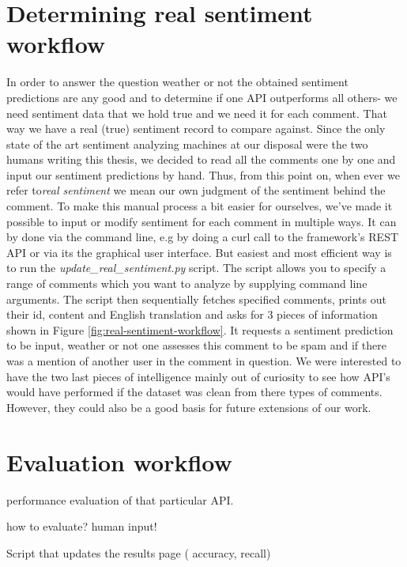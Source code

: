 \section{Determining real sentiment workflow\label{sec:determining-real-sentiment-workflow}}
In order to answer the question weather or not the obtained sentiment predictions are any good and to determine if one API outperforms all others- we need sentiment data that we hold true and we need it for each comment. That way we have a real (true) sentiment record to compare against.
Since the only state of the art sentiment analyzing machines at our disposal were the two humans writing this thesis, we decided to read all the comments one by one and input our sentiment predictions by hand. 
Thus, from this point on, when ever we refer to\textit{real sentiment} we mean our own judgment of the sentiment behind the comment.
To make this manual process  a bit easier for ourselves, we've made it possible to input or modify sentiment for each comment in multiple ways. It can by done via the command line, e.g by doing a curl call to the framework's REST API or via its the graphical user interface. 
But easiest and most efficient way is to run the \textit{update\_real\_sentiment.py} script. The script allows you to specify a range of comments which you want to analyze by supplying command line arguments.
The script then sequentially fetches specified comments, prints out their id, content and English translation and asks for 3 pieces of information shown in Figure \ref{fig:real-sentiment-workflow}. It requests a sentiment prediction to be input, weather or not one assesses this comment to be spam and if there was a mention of another user in the comment in question. 
We were interested to have the two last pieces of intelligence mainly out of curiosity to see how API's would have performed if the dataset was clean from there types of comments. 
However, they could also be a good basis for future extensions of our work. 




\section{Evaluation workflow\label{sec:sentiment-evaluation-workflow}}


performance evaluation of that particular API.

how to evaluate? human input! 

Script that updates the results page  ( accuracy, recall)



